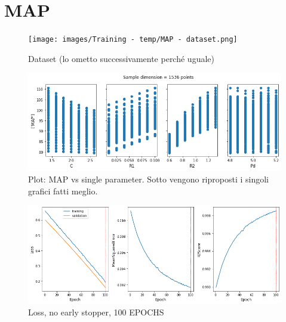 \newpage

\section{MAP}
\begin{figure}[h]
    \centering
    \texttt{[image: images/Training - temp/MAP - dataset.png]}
    \caption{Dataset (lo ometto successivamente perché uguale)}
\end{figure}

\newpage

\begin{figure}[h]
    \centering
    \includegraphics[width=1\textwidth]{images/Training - temp/MAP - parametri.png}
    \caption{Plot: MAP vs single parameter. Sotto vengono riproposti i singoli grafici fatti meglio.}
\end{figure}

\newpage

\begin{figure}[h]
    \centering
    \includegraphics[width=1\textwidth]{images/Training - temp/MAP - loss.png}
    \caption{Loss, no early stopper, 100 EPOCHS}
\end{figure}

\newpage

